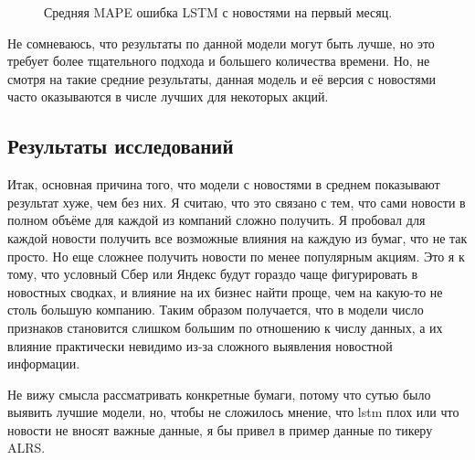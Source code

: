 \documentclass[12pt, a4paper]{article}
\begin{document}
\begin{figure}[!h]
\caption{Средняя MAPE ошибка LSTM с новостями на первый месяц.}
\label{fig:lstm_with_news}
\end{figure}

Не сомневаюсь, что результаты по данной модели могут быть лучше, но это требует более тщательного подхода и большего количества времени. Но, не смотря на такие средние результаты, данная модель и её версия с новостями часто оказываются в числе лучших для некоторых акций.

\subsection{Результаты исследований}

Итак, основная причина того, что модели с новостями в среднем показывают результат хуже, чем без них. Я считаю, что это связано с тем, что сами новости в полном объёме для каждой из компаний сложно получить. Я пробовал для каждой новости получить все возможные влияния на каждую из бумаг, что не так просто. Но еще сложнее получить новости по менее популярным акциям. Это я к тому, что условный Сбер или Яндекс будут гораздо чаще фигурировать в новостных сводках, и влияние на их бизнес найти проще, чем на какую-то не столь большую компанию. Таким образом получается, что в модели число признаков становится слишком большим по отношению к числу данных, а их влияние практически невидимо из-за сложного выявления новостной информации.

Не вижу смысла рассматривать конкретные бумаги, потому что сутью было выявить лучшие модели, но, чтобы не сложилось мнение, что lstm плох или что новости не вносят важные данные, я бы привел в пример данные по тикеру ALRS.
\end{document}
